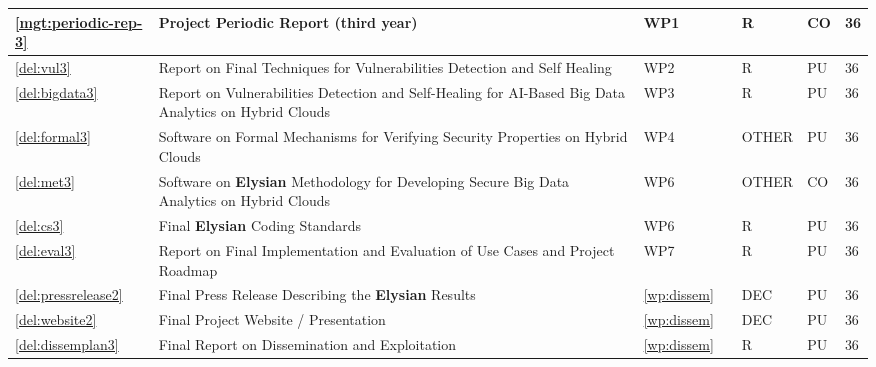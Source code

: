 \documentclass[a4paper,11pt]{article}
\newcommand{\project}[1]{\textbf{#1}\xspace}
\newcommand{\SECURITY}{\project{Elysian}}
\newcommand{\TheProject}{\SECURITY}
\begin{document}
\begin{minipage}{\textwidth}
\begin{center}
\begin{tabular}{|p{0.8cm}|p{9.65cm}|p{0.8cm}|p{1.15cm}|p{1.2cm}|p{0.8cm}|p{0.8cm}|}
\hline \ref{mgt:periodic-rep-3} & Project Periodic Report (third year) & WP1 & \coordshort{} & R & CO & 36 \\
\hline \ref{del:vul3} & Report on Final Techniques for Vulnerabilities Detection and Self Healing & WP2 & \IBMshort{} & R & PU & 36 \\
\hline \ref{del:bigdata3} & Report on Vulnerabilities Detection and Self-Healing for AI-Based Big Data Analytics on Hybrid Clouds & WP3 & \SCCHshort{} & R & PU & 36 \\
\hline \ref{del:formal3} & Software on Formal Mechanisms for Verifying Security Properties on Hybrid Clouds & WP4 & \SAshort{} & OTHER & PU & 36 \\
\hline \ref{del:met3} & Software on \TheProject{} Methodology for Developing Secure Big Data Analytics on Hybrid Clouds & WP6 & \YAGshort{} & OTHER & CO & 36 \\
\hline \ref{del:cs3} & Final \TheProject{} Coding Standards & WP6 & \UCMshort{} & R & PU & 36 \\
\hline \ref{del:eval3} & Report on Final Implementation and Evaluation of Use Cases and Project Roadmap & WP7 & \FRQshort{} & R & PU & 36 \\
\hline \ref{del:pressrelease2} & Final Press Release Describing the \TheProject{} Results & \ref{wp:dissem} & \SAshort{} & DEC & PU & 36 \\
\hline \ref{del:website2} & Final Project Website / Presentation & \ref{wp:dissem} & \UODshort{} & DEC & PU & 36 \\
\hline \ref{del:dissemplan3} & Final Report on Dissemination and Exploitation & \ref{wp:dissem} & \UODshort{} & R & PU &  36 \\

\hline
\end{tabular}
\end{center}
\end{minipage}




%



\bigskip\bigskip\bigskip
\pagebreak
{}
\end{document}
